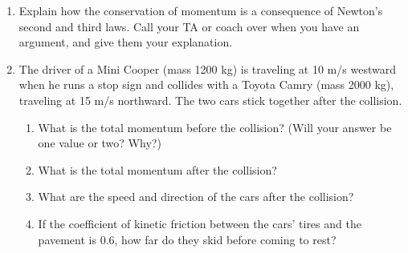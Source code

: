 \documentclass[12pt]{article}
\begin{document}
\Large
\centerline{}

\normalsize
\centerline{}

\begin{enumerate}


\vspace{2in}

\item Explain how the conservation of momentum is a consequence of Newton's second and third laws. Call your TA or coach over when you have an argument, and give them your explanation. 

  \item{The driver of a Mini Cooper (mass 1200 kg) is traveling at 10 m/s westward when he runs a stop sign and collides with a Toyota Camry (mass 2000 kg), traveling at 15 m/s northward. The two cars stick together after the collision.} 
      \begin{enumerate}
    \item What is the total momentum before the collision? (Will your answer be one value or two? Why?)

\vspace{1.5in}

    \item What is the total momentum after the collision?

\vspace{1.5in}
    \item{What are the speed and direction of the cars after the collision?}

\vspace{3in}
\newpage
    \item{If the coefficient of kinetic friction between the cars' tires and the pavement is 0.6, how far do they skid before coming to rest?}

\vspace{4in}

  \end{enumerate}




\end{enumerate}
\end{document}
